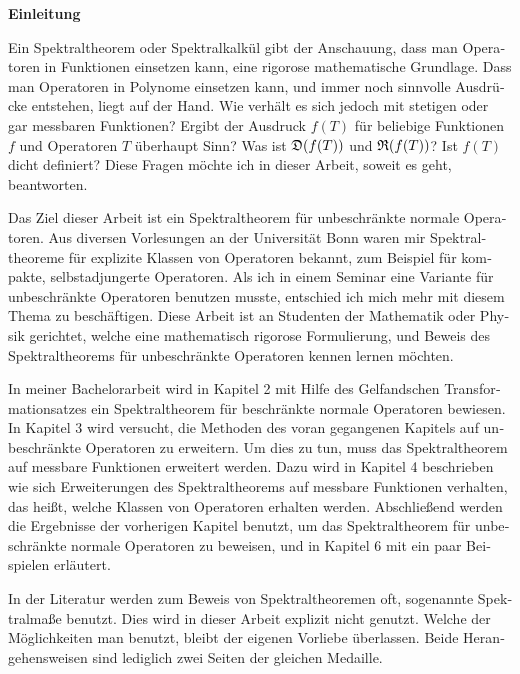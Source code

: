 {\Large \textbf{Einleitung}}
\vspace{.35cm}
\begin{otherlanguage}{ngerman}
Ein Spektraltheorem oder Spektralkalkül gibt der Anschauung, dass man 
Operatoren in Funktionen einsetzen kann, eine 
rigorose mathematische Grundlage.
Dass man Operatoren in Polynome einsetzen kann, und immer noch sinnvolle
Ausdrücke entstehen, liegt auf der Hand. Wie verhält es sich jedoch mit
stetigen oder gar messbaren Funktionen? Ergibt der Ausdruck $f(T)$ für
beliebige Funktionen $f$ und Operatoren $T$ überhaupt Sinn? Was ist 
$\mathfrak{D}(f(T))$ und $\mathfrak{R}(f(T))$? Ist $f(T)$ dicht definiert?
Diese Fragen möchte ich in dieser Arbeit, soweit es geht, beantworten.

Das Ziel dieser Arbeit ist ein Spektraltheorem für unbeschränkte normale 
Operatoren. Aus diversen Vorlesungen an der Universität Bonn waren mir
Spektraltheoreme für explizite Klassen von Operatoren bekannt, zum 
Beispiel für kompakte, selbstadjungerte Operatoren. Als ich in einem Seminar
eine Variante für unbeschränkte Operatoren benutzen musste, entschied ich
mich mehr mit diesem Thema zu beschäftigen. Diese Arbeit
ist an Studenten der Mathematik oder Physik gerichtet, welche eine 
mathematisch rigorose Formulierung, und Beweis des Spektraltheorems
für unbeschränkte Operatoren kennen lernen möchten.

In meiner Bachelorarbeit wird in Kapitel 2 mit Hilfe des Gelfandschen 
Transformationsatzes ein Spektraltheorem für beschränkte normale Operatoren 
bewiesen. In Kapitel 3 wird versucht, die Methoden des voran gegangenen Kapitels
auf unbeschränkte Operatoren zu erweitern. Um dies zu tun, muss das 
Spektraltheorem auf messbare Funktionen erweitert werden.
Dazu wird in Kapitel 4 beschrieben wie sich Erweiterungen des 
Spektraltheorems auf messbare Funktionen verhalten, das heißt, welche Klassen
von Operatoren erhalten werden. Abschließend werden die Ergebnisse der 
vorherigen Kapitel benutzt, um das Spektraltheorem für unbeschränkte normale
Operatoren zu beweisen, und in Kapitel 6 mit ein paar Beispielen erläutert.

In der Literatur werden zum Beweis von Spektraltheoremen oft, sogenannte 
Spektralmaße benutzt.
Dies wird in dieser Arbeit explizit nicht genutzt. Welche der Möglichkeiten
man benutzt, bleibt der eigenen Vorliebe überlassen. Beide Herangehensweisen
sind lediglich zwei Seiten der 
gleichen Medaille.

\end{otherlanguage}